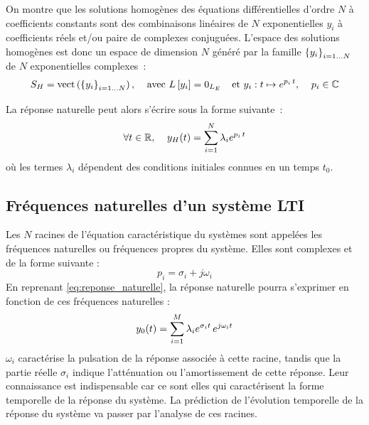       On montre que les solutions homogènes des équations
      différentielles d'ordre $N$ à coefficients constants sont des
      combinaisons linéaires de $N$ exponentielles $y_i$ à
      coefficients réels et/ou paire de complexes conjuguées. L'espace
      des solutions homogènes est donc un espace de dimension $N$
      généré par la famille $\left\{y_i\right\}_{i=1\dots N}$ de $N$
      exponentielles complexes~:
	\begin{equation}\label{eq:sol_homogene_ordre_n}
          S_H=\mathrm{vect}\left(\left\{y_i\right\}_{i=1\dots N}\right),\;\;\;\; \text{avec } L\left[y_i\right]=\mathrm{0}_{L_E}\;\;\;\;\text{et }y_i : t\mapsto e^{p_i\,t},\;\;\;\; p_i\in\mathbb{C}     
	\end{equation}

        La réponse naturelle peut alors s'écrire sous la forme
        suivante~:
	\begin{equation}\label{eq:reponse_naturelle}
          \forall t\in\mathbb{R},\;\;\;\; y_{H}(t) = \sum_{i=1}^N \lambda_{i} e^{p_i\,t}
	\end{equation}
	où les termes $\lambda_{i}$ dépendent des conditions initiales
        connues en un temps $t_{0}$.	
        
	\subsection{Fréquences naturelles d'un système LTI}
	Les $N$ racines de l'équation caractéristique du systèmes sont
        appelées les fréquences naturelles ou fréquences propres du
        système. Elles sont complexes et de la forme suivante :
	\begin{equation}\label{freq_propre}
          p_{i} = \sigma_{i} + j\omega_{i} 
	\end{equation}	
	En reprenant \ref{eq:reponse_naturelle}, la réponse naturelle
        pourra s'exprimer en fonction de ces fréquences naturelles :		
	\begin{equation}\label{eq:reponse_naturelle_freq}
          y_{0}(t) = \sum_{i=1}^M \lambda_{i}e^{\sigma_{i}t}\,e^{j\omega_{i}t}
	\end{equation}
	$\omega_{i}$ caractérise la pulsation de la réponse associée à
        cette racine, tandis que la partie réelle $\sigma_{i}$ indique
        l'atténuation ou l'amortissement de cette réponse. Leur
        connaissance est indispensable car ce sont elles qui
        caractérisent la forme temporelle de la réponse du système. La
        prédiction de l'évolution temporelle de la réponse du système
        va passer par l'analyse de ces racines.
	
